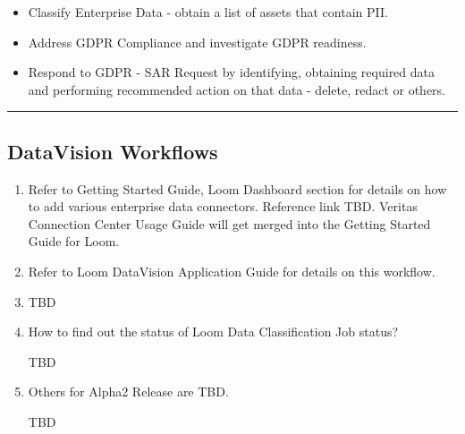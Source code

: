\documentclass[letterpaper,10pt,english]{sphinxmanual}
\begin{document}
\begin{enumerate}
\begin{itemize}
\item {} 
Classify Enterprise Data - obtain a list of assets that contain PII.

\item {} 
Address GDPR Compliance and investigate GDPR readiness.

\item {} 
Respond to GDPR - SAR Request by identifying, obtaining required data and performing recommended action on that data - delete, redact or others.

\end{itemize}

\end{enumerate}


\bigskip\hrule\bigskip



\subsection{DataVision Workflows}
\label{\detokenize{loom_getting_started_guide:usage-wf-datavision}}\label{\detokenize{loom_getting_started_guide:datavision-workflows}}\begin{enumerate}
\item {} 

Refer to Getting Started Guide, Loom Dashboard section for details on how to add various enterprise data connectors. Reference link TBD. Veritas Connection Center Usage Guide will get merged into the Getting Started Guide for Loom.

\item {} 

Refer to Loom DataVision Application Guide for details on this workflow.

\item {} 

TBD

\item {} 
How to find out the status of Loom Data Classification Job status?

TBD

\item {} 
Others for Alpha2 Release are TBD.

TBD

\end{enumerate}
\end{document}
